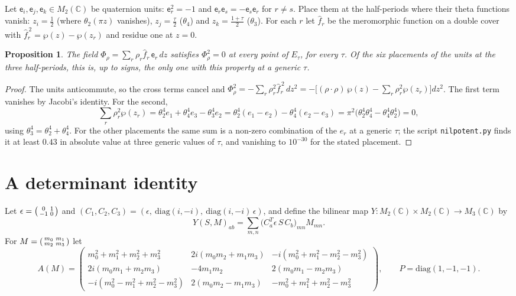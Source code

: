 \documentclass[11pt]{article}
\newtheorem{proposition}[theorem]{Proposition}
\theoremstyle{remark}
\newcommand{\C}{\mathbb{C}}
\begin{document}
Let $\mathsf e_i,\mathsf e_j,\mathsf e_k\in M_2(\C)$ be quaternion units: $\mathsf e_r^2=-1$ and $\mathsf e_r\mathsf e_s=-\mathsf e_s\mathsf e_r$ for
$r\neq s$. Place them at the half-periods where their theta functions vanish: $z_i=\tfrac12$ (where $\theta_2(\pi z)$
vanishes), $z_j=\tfrac\tau2$ ($\theta_4$) and $z_k=\tfrac{1+\tau}2$ ($\theta_3$). For each $r$ let $\hat f_r$ be the meromorphic
function on a double cover with $\hat f_r^{\,2}=\wp(z)-\wp(z_r)$ and residue one at $z=0$.

\begin{proposition}\label{prop:nil}
The field $\Phi_\rho=\sum_r\rho_r\hat f_r\,\mathsf e_r\,dz$ satisfies $\Phi_\rho^2=0$ at every point of $E_\tau$, for every $\tau$.
Of the six placements of the units at the three half-periods, this is, up to signs, the only one with this property at
a generic $\tau$.
\end{proposition}
\begin{proof}
The units anticommute, so the cross terms cancel and
$\Phi_\rho^2=-\sum_r\rho_r^2\hat f_r^{\,2}\,dz^2=-\bigl[(\rho\cdot\rho)\,\wp(z)-\sum_r\rho_r^2\wp(z_r)\bigr]dz^2$. The first term vanishes
by Jacobi's identity. For the second,
\[
  \textstyle\sum_r\rho_r^2\wp(z_r)=\theta_2^4e_1+\theta_4^4e_3-\theta_3^4e_2
  =\theta_2^4(e_1-e_2)-\theta_4^4(e_2-e_3)=\pi^2\bigl(\theta_2^4\theta_4^4-\theta_4^4\theta_2^4\bigr)=0,
\]
using $\theta_3^4=\theta_2^4+\theta_4^4$. For the other placements the same sum is a non-zero combination of the $e_r$ at a
generic $\tau$; the script \texttt{nilpotent.py} finds it at least $0.43$ in absolute value at three generic values of
$\tau$, and vanishing to $10^{-30}$ for the stated placement.
\end{proof}

\section{A determinant identity}\label{sec:det}

Let $\epsilon=\begin{psmallmatrix}0&1\\-1&0\end{psmallmatrix}$ and $(C_1,C_2,C_3)=(\epsilon,\ \mathrm{diag}(i,-i),\ \mathrm{diag}(i,-i)\,\epsilon)$,
and define the bilinear map $Y:M_2(\C)\times M_2(\C)\to M_3(\C)$ by
\[
  Y(S,M)_{ab}=\sum_{m,n}\bigl(C_a^{T}\epsilon\,S\,C_b\bigr)_{mn}M_{mn}.
\]
For $M=\begin{psmallmatrix}m_0&m_1\\m_2&m_3\end{psmallmatrix}$ let
\[
  A(M)=\begin{pmatrix}
  m_0^2+m_1^2+m_2^2+m_3^2 & 2i(m_0m_2+m_1m_3) & -i(m_0^2+m_1^2-m_2^2-m_3^2)\\
  2i(m_0m_1+m_2m_3) & -4m_1m_2 & 2(m_0m_1-m_2m_3)\\
  -i(m_0^2-m_1^2+m_2^2-m_3^2) & 2(m_0m_2-m_1m_3) & -m_0^2+m_1^2+m_2^2-m_3^2
  \end{pmatrix},\qquad P=\mathrm{diag}(1,-1,-1).
\]
\end{document}
